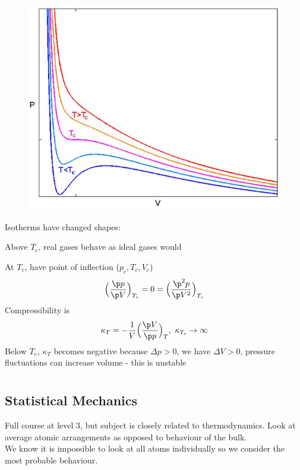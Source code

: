 \documentclass[a4paper, 11pt, normalem]{report}
\begin{document}
\begin{figure}
    \begin{center}
        \includegraphics[scale=0.3]{IsoReal.png}
    \end{center}
\end{figure}

Isotherms have changed shapes:

Above $T_c$, real gases behave as ideal gases would

At $T_c$, have point of inflection ($p_c, T_c, V_c$)
\begin{equation*}
    \Big(\frac{\p p}{\p V}\Big)_{T_c} = 0 = \Big(\frac{\p^2 p}{\p V^2}\Big)_{T_c}
\end{equation*}
Compressibility is
\begin{equation*}
    \kappa_T = -\frac{1}{V}\Big(\frac{\p V}{\p p}\Big)_T,~ \kappa_{T_c} \to \infty
\end{equation*}
Below $T_c$, $\kappa_T$ becomes negative because $\Delta p > 0$, we have $\Delta V > 0$, pressure fluctuations can increase volume - this is unstable

\chapter{}
\section{Statistical Mechanics}
Full course at level 3, but subject is closely related to thermodynamics. Look at average atomic arrangements as opposed to behaviour of the bulk. \\
We know it is impossible to look at all atoms individually so we consider the most probable behaviour.
\end{document}
